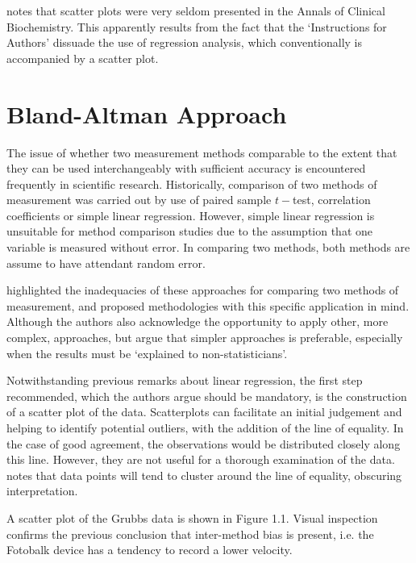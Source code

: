 \documentclass[12pt, a4paper]{report}
\theoremstyle{plain}
\theoremstyle{definition}
\theoremstyle{remark}
\begin{document}
	\citet{Dewitte} notes that scatter plots were very seldom
	presented in the Annals of Clinical Biochemistry. This apparently
	results from the fact that the `Instructions for Authors' dissuade
	the use of regression analysis, which conventionally is
	accompanied by a scatter plot.
	
	\newpage
	\section{Bland-Altman Approach}
	The issue of whether two measurement methods comparable to the
	extent that they can be used interchangeably with sufficient
	accuracy is encountered frequently in scientific research.
	Historically, comparison of two methods of measurement was carried
	out by use of paired sample $t-$test, correlation coefficients or
	simple linear regression. However, simple linear regression is unsuitable for method comparison studies due to the assumption that one variable is measured without error. In comparing two methods, both methods are assume to have attendant random error.
	
	\citet{BA83} highlighted the inadequacies of these approaches for comparing two methods of measurement, and proposed methodologies with this specific application in mind. Although the authors also acknowledge the opportunity to apply other, more complex, approaches, but argue that simpler approaches is preferable, especially when the
	results must be `explained to non-statisticians'.
	
	Notwithstanding previous remarks about linear regression, the first step recommended, which the authors argue should be mandatory, is the construction of a scatter plot of the data. Scatterplots can facilitate an initial judgement and
	helping to identify potential outliers, with the addition of the line of equality. In the case of good agreement, the observations would be distributed closely along this line. However, they are not useful for a thorough examination of the data. \citet{BritHypSoc} notes that
	data points will tend to cluster around the line of equality, obscuring interpretation.
	
	
	A scatter plot of the Grubbs data is shown in Figure 1.1. Visual inspection confirms the previous conclusion that inter-method bias is present, i.e. the Fotobalk device has a tendency to record a lower velocity.
	
\end{document}
